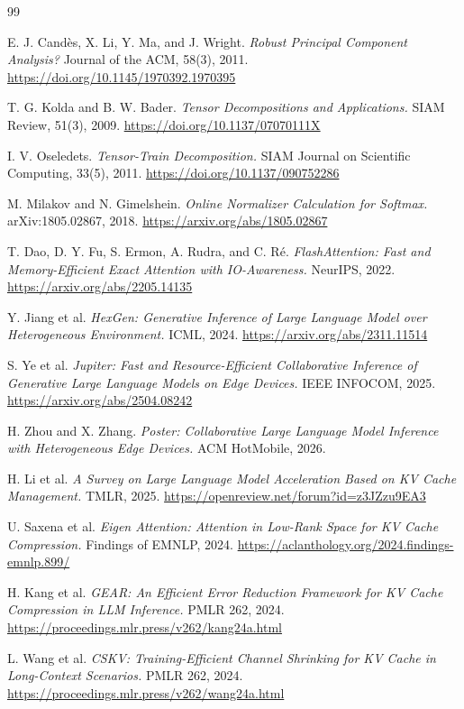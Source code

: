 \documentclass[10pt]{article}
\begin{document}
\newpage
\small
\begin{thebibliography}{99}

 E. J. Cand\`es, X. Li, Y. Ma, and J. Wright. \emph{Robust Principal Component
Analysis?} Journal of the ACM, 58(3), 2011.
\url{https://doi.org/10.1145/1970392.1970395}

 T. G. Kolda and B. W. Bader. \emph{Tensor Decompositions and Applications.}
SIAM Review, 51(3), 2009. \url{https://doi.org/10.1137/07070111X}

 I. V. Oseledets. \emph{Tensor-Train Decomposition.} SIAM Journal on Scientific
Computing, 33(5), 2011. \url{https://doi.org/10.1137/090752286}

 M. Milakov and N. Gimelshein. \emph{Online Normalizer Calculation for
Softmax.} arXiv:1805.02867, 2018. \url{https://arxiv.org/abs/1805.02867}

 T. Dao, D. Y. Fu, S. Ermon, A. Rudra, and C. R\'e.
\emph{FlashAttention: Fast and Memory-Efficient Exact Attention with IO-Awareness.}
NeurIPS, 2022.
\url{https://arxiv.org/abs/2205.14135}

 Y. Jiang et al. \emph{HexGen: Generative Inference of Large Language Model over
Heterogeneous Environment.} ICML, 2024. \url{https://arxiv.org/abs/2311.11514}

 S. Ye et al. \emph{Jupiter: Fast and Resource-Efficient Collaborative Inference
of Generative Large Language Models on Edge Devices.} IEEE INFOCOM, 2025.
\url{https://arxiv.org/abs/2504.08242}

 H. Zhou and X. Zhang. \emph{Poster: Collaborative Large Language Model Inference
with Heterogeneous Edge Devices.} ACM HotMobile, 2026.

 H. Li et al. \emph{A Survey on Large Language Model Acceleration Based on KV
Cache Management.} TMLR, 2025. \url{https://openreview.net/forum?id=z3JZzu9EA3}

 U. Saxena et al. \emph{Eigen Attention: Attention in Low-Rank Space for KV Cache
Compression.} Findings of EMNLP, 2024.
\url{https://aclanthology.org/2024.findings-emnlp.899/}

 H. Kang et al. \emph{GEAR: An Efficient Error Reduction Framework for KV Cache
Compression in LLM Inference.} PMLR 262, 2024.
\url{https://proceedings.mlr.press/v262/kang24a.html}

 L. Wang et al. \emph{CSKV: Training-Efficient Channel Shrinking for KV Cache in
Long-Context Scenarios.} PMLR 262, 2024.
\url{https://proceedings.mlr.press/v262/wang24a.html}


\end{thebibliography}
\end{document}
